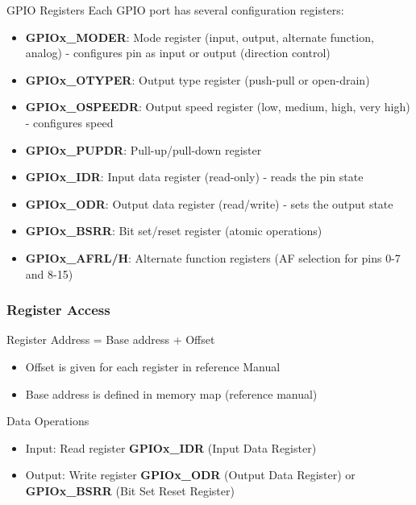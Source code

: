 \begin{definition}{GPIO Registers}
Each GPIO port has several configuration registers:
\begin{itemize}
    \item \textbf{GPIOx\_MODER}: Mode register (input, output, alternate function, analog) - configures pin as input or output (direction control)
    \item \textbf{GPIOx\_OTYPER}: Output type register (push-pull or open-drain)
    \item \textbf{GPIOx\_OSPEEDR}: Output speed register (low, medium, high, very high) - configures speed
    \item \textbf{GPIOx\_PUPDR}: Pull-up/pull-down register
    \item \textbf{GPIOx\_IDR}: Input data register (read-only) - reads the pin state
    \item \textbf{GPIOx\_ODR}: Output data register (read/write) - sets the output state
    \item \textbf{GPIOx\_BSRR}: Bit set/reset register (atomic operations)
    \item \textbf{GPIOx\_AFRL/H}: Alternate function registers (AF selection for pins 0-7 and 8-15)
\end{itemize}
\end{definition}

\subsubsection{Register Access}

\begin{theorem}{Register Address} = Base address + Offset
    \begin{itemize}
        \item Offset is given for each register in reference Manual
        \item Base address is defined in memory map (reference manual)
    \end{itemize}
\end{theorem}

\begin{corollary}{Data Operations}
    \begin{itemize}
        \item Input: Read register \textbf{GPIOx\_IDR} (Input Data Register)
        \item Output: Write register \textbf{GPIOx\_ODR} (Output Data Register) or \textbf{GPIOx\_BSRR} (Bit Set Reset Register)
    \end{itemize}
\end{corollary}

